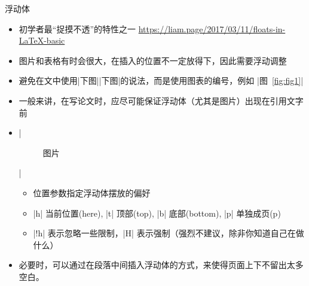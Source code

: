 \begin{frame}[fragile]{浮动体}
    \begin{itemize}
        \item 初学者最“捉摸不透”的特性之一 \url{https://liam.page/2017/03/11/floats-in-LaTeX-basic}
        \item 图片和表格有时会很大，在插入的位置不一定放得下，因此需要浮动调整
        \item 避免在文中使用|下图||下图|的说法，而是使用图表的编号，例如 |图~\ref{fig:fig1}|
        \item 一般来讲，在写论文时，应尽可能保证浮动体（尤其是图片）出现在引用文字前
        \item |\begin{figure}[<位置参数>] 图片 \end{figure}|
              \begin{itemize}
                  \item 位置参数指定浮动体摆放的偏好
                  \item |h| 当前位置(here), |t| 顶部(top), |b| 底部(bottom), |p| 单独成页(p)
                  \item |!h| 表示忽略一些限制，|H| 表示强制\alert{（强烈不建议，除非你知道自己在做什么）}
              \end{itemize}
        \item 必要时，可以通过在段落中间插入浮动体的方式，来使得页面上下不留出太多空白。
    \end{itemize}
\end{frame}

